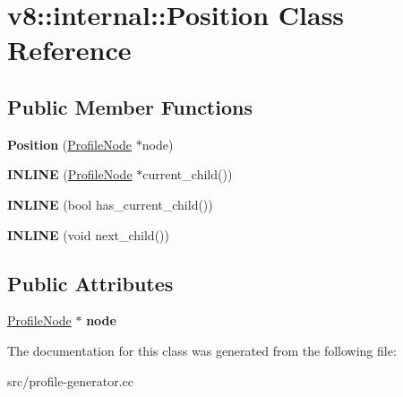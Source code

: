 \hypertarget{classv8_1_1internal_1_1_position}{}\section{v8\+:\+:internal\+:\+:Position Class Reference}
\label{classv8_1_1internal_1_1_position}
\subsection*{Public Member Functions}
\begin{DoxyCompactItemize}
\item 
\hypertarget{classv8_1_1internal_1_1_position_abe904a2351771f5689f89c648353c29c}{}{\bfseries Position} (\hyperlink{classv8_1_1internal_1_1_profile_node}{Profile\+Node} $\ast$node)\label{classv8_1_1internal_1_1_position_abe904a2351771f5689f89c648353c29c}

\item 
\hypertarget{classv8_1_1internal_1_1_position_ad8ac4d8275ccaa7fb3b2edf97ae46aa8}{}{\bfseries I\+N\+L\+I\+N\+E} (\hyperlink{classv8_1_1internal_1_1_profile_node}{Profile\+Node} $\ast$current\+\_\+child())\label{classv8_1_1internal_1_1_position_ad8ac4d8275ccaa7fb3b2edf97ae46aa8}

\item 
\hypertarget{classv8_1_1internal_1_1_position_a8d622bb9deb8676f2ab033758d8de110}{}{\bfseries I\+N\+L\+I\+N\+E} (bool has\+\_\+current\+\_\+child())\label{classv8_1_1internal_1_1_position_a8d622bb9deb8676f2ab033758d8de110}

\item 
\hypertarget{classv8_1_1internal_1_1_position_a8b588adecd9cc4e4a8979d30c216e634}{}{\bfseries I\+N\+L\+I\+N\+E} (void next\+\_\+child())\label{classv8_1_1internal_1_1_position_a8b588adecd9cc4e4a8979d30c216e634}

\end{DoxyCompactItemize}
\subsection*{Public Attributes}
\begin{DoxyCompactItemize}
\item 
\hypertarget{classv8_1_1internal_1_1_position_a59842d5a15c7578368190dccf7aa323a}{}\hyperlink{classv8_1_1internal_1_1_profile_node}{Profile\+Node} $\ast$ {\bfseries node}\label{classv8_1_1internal_1_1_position_a59842d5a15c7578368190dccf7aa323a}

\end{DoxyCompactItemize}


The documentation for this class was generated from the following file\+:\begin{DoxyCompactItemize}
\item 
src/profile-\/generator.\+cc\end{DoxyCompactItemize}
